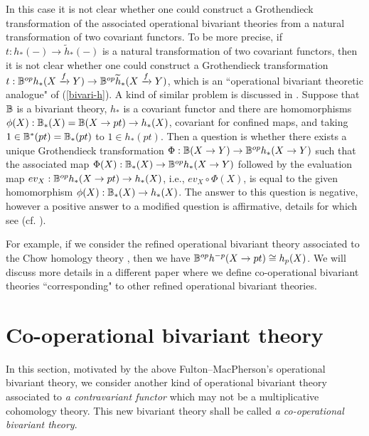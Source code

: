 \documentclass[a4paper]{amsart}
\begin{document}
In this case it is not clear whether one could construct a Grothendieck transformation of the associated operational bivariant theories from a natural transformation of two covariant functors. To be more precise, if $t :h_*(-) \to \widetilde h_*(-)$ is a natural transformation of two covariant functors, then it is not clear whether one could construct a Grothendieck transformation $t:\mathbb B^{op}h_*(X \xrightarrow f Y) \to \mathbb B^{op}\widetilde h_*(X \xrightarrow f Y)$, which is an ``operational bivariant theoretic analogue" of (\ref{bivari-h}). A kind of similar problem is discussed in \cite[\S 8.2]{FM}. Suppose that $\mathbb B$ is a bivariant theory, $h_*$ is a covariant functor and there are homomorphisms $\phi(X): \mathbb B_*(X)=\mathbb B(X \to pt) \to h_*(X)$, covariant for confined maps, and taking $1 \in \mathbb B^*(pt)=\mathbb B_*(pt)$ to $1 \in h_*(pt)$. Then a question is whether there exists a unique Grothendieck transformation $\Phi:\mathbb B(X \to Y) \to \mathbb B^{op}h_*(X \to Y)$ such that the associated map $\Phi(X): \mathbb B_*(X) \to \mathbb B^{op}h_*(X \to Y)$ followed by the evaluation map $ev_X:\mathbb B^{op}h_*(X \to pt) \to h_*(X)$, i.e., $ev_X \circ \Phi(X)$, is equal to the given homomorphism $\phi(X):\mathbb B_*(X) \to h_*(X)$. The answer to this question is negative, however a positive answer to a modified question is affirmative, details for which see \cite{Yokura-ope} (cf. \cite{BSY-jpaa}). 
\begin{rem} For example, if we consider the refined operational bivariant theory associated to the Chow homology theory \cite[Proposition 17.3.1]{Ful}, then we have $\mathbb B^{op}h^{-p}(X \to pt) \cong h_p(X)$. We will discuss more details in a different paper where we define
co-operational bivariant theories ``corresponding" to other refined operational bivariant theories.
\end{rem}

\section{Co-operational bivariant theory}\label{coop}
In this section, motivated by the above Fulton--MacPherson's operational bivariant theory, we consider another kind of operational bivariant theory associated to \emph{a contravariant functor} which may not be a multiplicative cohomology theory. This new bivariant theory shall be called \emph{a co-operational bivariant theory}.
\end{document}
